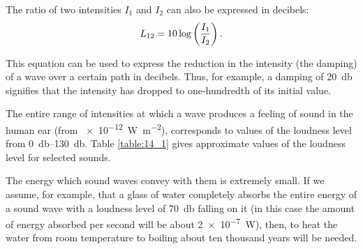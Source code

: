 The ratio of two intensities $I_1$ and $I_2$ can also be expressed in decibels:
\begin{equation}\label{eq:14_64}
	L_{12} = 10 \log\left(\frac{I_1}{I_2}\right).
\end{equation}

\noindent
This equation can be used to express the reduction in the intensity (the damping) of a wave over a certain path in decibels.
Thus, for example, a damping of \SI{20}{\decibel} signifies that the intensity has dropped to one-hundredth of its initial value.

The entire range of intensities at which a wave produces a feeling of sound in the human ear (from \SI{e-12}{\watt\per\metre\squared}), corresponds to values of the loudness level from \SIrange{0}{130}{\decibel}.
Table \ref{table:14_1} gives approximate values of the loudness level for selected sounds.

The energy which sound waves convey with them is extremely small.
If we assume, for example, that a glass of water completely absorbs the entire energy of a sound wave with a loudness level of \SI{70}{\decibel} falling on it (in this case the amount of energy absorbed per second will be about \SI{2e-7}{\watt}), then, to heat the water from room temperature to boiling about ten thousand years will be needed.

\begin{table}[!b]
	\renewcommand{\arraystretch}{1.2}
	\caption{}
	\vspace{-0.6cm}
	\label{table:14_1}
	\begin{center}\end{center}
\end{table}

